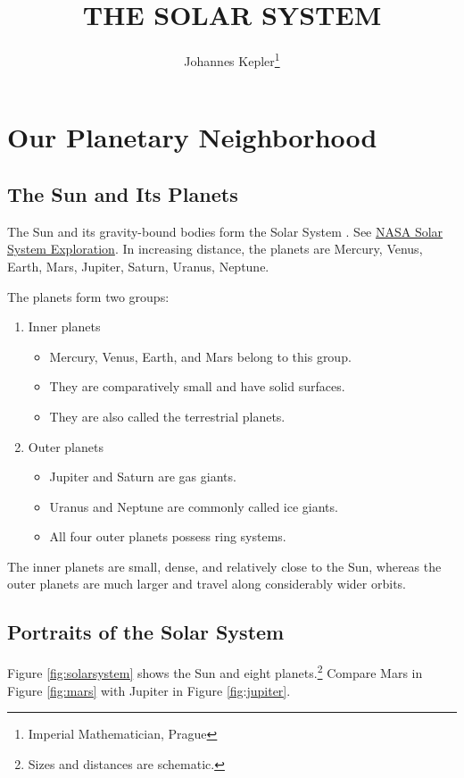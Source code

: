 \documentclass[11pt,a4paper]{article}
\title{THE SOLAR SYSTEM}
\author{Johannes Kepler\footnote{Imperial Mathematician, Prague}}
\date{}
\begin{document}
\maketitle
\tableofcontents
\newpage

\section{Our Planetary Neighborhood}
\subsection{The Sun and Its Planets}
The Sun and its gravity-bound bodies form the Solar System \cite{kepler}. See \href{https://science.nasa.gov/solar-system/}{NASA Solar System Exploration}. In increasing distance, the planets are
Mercury, Venus, Earth, Mars, Jupiter, Saturn, Uranus, Neptune.

The planets form two groups:
\begin{enumerate}[label=(\Roman*)]
    \item Inner planets
    \begin{itemize}[label=$\dagger$]
        \item Mercury, Venus, Earth, and Mars belong to this group.
        \item They are comparatively small and have solid surfaces.
        \item They are also called the terrestrial planets.
    \end{itemize}
    \item Outer planets
    \begin{itemize}[label=$\dagger$]
        \item Jupiter and Saturn are gas giants.
        \item Uranus and Neptune are commonly called ice giants.
        \item All four outer planets possess ring systems.
    \end{itemize}
\end{enumerate}
The inner planets are small, dense, and relatively close to the Sun, whereas the outer planets are much larger and travel along considerably wider orbits.

\subsection{Portraits of the Solar System}
Figure \ref{fig:solarsystem} shows the Sun and eight planets.\footnote{Sizes and distances are schematic.} Compare Mars in Figure \ref{fig:mars} with Jupiter in Figure \ref{fig:jupiter}.
\end{document}
